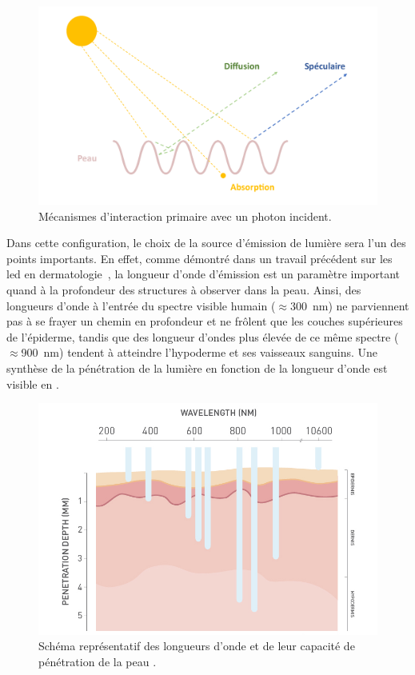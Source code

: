 \begin{figure}[H]
    \centering
    \includegraphics[width=\linewidth]{contents/chapter_2/resources/light_interaction.pdf}
    \caption{Mécanismes d'interaction primaire avec un photon incident.}
    \label{fig:light_interaction}
\end{figure}\par
Dans cette configuration, le choix de la source d'émission de lumière sera l'un des points importants. En effet, comme démontré dans un travail précédent sur les \gls{led} en dermatologie~\cite{Barolet2008}, la longueur d'onde d'émission est un paramètre important quand à la profondeur des structures à observer dans la peau. Ainsi, des longueurs d'onde à l'entrée du spectre visible humain ($\approx$\SI{300}{\nano\metre}) ne parviennent pas à se frayer un chemin en profondeur et ne frôlent que les couches supérieures de l'épiderme, tandis que des longueur d'ondes plus élevée de ce même spectre ($\approx$\SI{900}{\nano\metre}) tendent à atteindre l'hypoderme et ses vaisseaux sanguins. Une synthèse de la pénétration de la lumière en fonction de la longueur d'onde est visible en .\par
\begin{figure}[H]
    \centering
    \includegraphics[width=0.8\linewidth]{contents/chapter_2/resources/light_penatrating.png}
    \caption{Schéma représentatif des longueurs d’onde et de leur capacité de pénétration de la peau \cite{Barolet2008}.}
    \label{fig:light_penatrating}
\end{figure}
